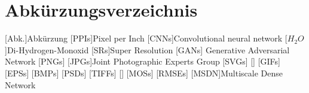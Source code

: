 
\chapter*{Abkürzungsverzeichnis}

\begin{acronym}[DHBW]
    [Abk.]{Abkürzung}
    [PPIs]{Pixel per Inch}
    [CNNs]{Convolutional neural network}
    [\ensuremath{H_2O}]{Di-Hydrogen-Monoxid}
    [SRs]{Super Resolution}
    [GANs] {Generative Adversarial Network}
    [PNGs]{}
    [JPGs]{Joint Photographic Experts Group}
    [SVGs]{}
    []{}
    [GIFs]{}
    [EPSs]{}
    [BMPs]{}
    [PSDs]{}
    [TIFFs]{}
    []{}
    [MOSs]{}
    [RMSEs]{}
    [MSDN]{Multiscale Dense Network}
\end{acronym}
